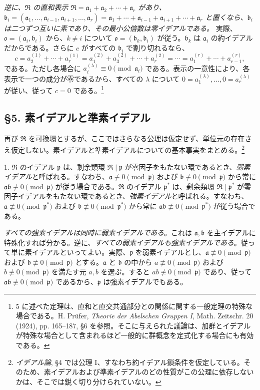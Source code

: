 \documentclass[11pt]{article}
\providecommand{\mR}{\mathfrak{R}}
\providecommand{\ma}{\mathfrak{a}}
\providecommand{\mb}{\mathfrak{b}}
\providecommand{\mo}{\mathfrak{o}}
\providecommand{\mpideal}{\mathfrak{p}}
\begin{document}
\emph{逆に、$\mR$ の直和表示 $\mR=\ma_1+\ma_2+\cdots+\ma_r$ があり、$\mb_i=(\ma_1,\ldots,\ma_{i-1},\ma_{i+1},\ldots,\ma_r)=\ma_1+\cdots+\ma_{i-1}+\ma_{i+1}+\cdots+\ma_r$ と置くなら、$\mb_i$ は二つずつ互いに素であり、その最小公倍数は零イデアルである。} 実際、$\mo=(\ma_i,\mb_i)$ から、$k\ne i$ について $\mo=(\mb_k,\mb_i)$ が従う。$\mb_k$ は $\ma_i$ の約イデアルだからである。さらに $c$ がすべての $\mb_i$ で割り切れるなら、
\[
 c=a_2^{(1)}+\cdots+a_r^{(1)}=a_1^{(2)}+a_3^{(2)}+\cdots+a_r^{(2)}=\cdots=a_1^{(r)}+\cdots+a_{r-1}^{(r)},
\]
である。ただし各場合に $a_i^{(\lambda)}\equiv0\pmod{\ma_i}$ である。表示の一意性により、各表示で一つの成分が零であるから、すべての $\lambda$ について $0=a_1^{(\lambda)},\ldots,0=a_r^{(\lambda)}$ が従い、従って $c=0$ である。\footnote{5 に述べた定理は、直和と直交共通部分との関係に関する一般定理の特殊な場合である。H. Prüfer, \emph{Theorie der Abelschen Gruppen I}, Math. Zeitschr. 20 (1924), pp. 165--187, §6 を参照。そこに与えられた議論は、加群とイデアルが特殊な場合として含まれるほど一般的に群概念を定式化する場合にも有効である。}

\subsection*{§5. 素イデアルと準素イデアル}

再び $\mR$ を可換環とするが、ここではさらなる公理は仮定せず、単位元の存在さえ仮定しない。素イデアルと準素イデアルについての基本事実をまとめる。\footnote{\emph{イデアル論}, §4 では公理 I、すなわち約イデアル鎖条件を仮定している。そのため、素イデアルおよび準素イデアルのどの性質がこの公理に依存しないかは、そこでは鋭く切り分けられていない。}

1. $\mR$ のイデアル $\mpideal$ は、剰余類環 $\mR\mid\mpideal$ が零因子をもたない環であるとき、\emph{弱素イデアル}と呼ばれる。すなわち、$\ma\not\equiv0\pmod{\mpideal}$ および $\mb\not\equiv0\pmod{\mpideal}$ から常に $\ma\mb\not\equiv0\pmod{\mpideal}$ が従う場合である。$\mR$ のイデアル $\mpideal^*$ は、剰余類環 $\mR\mid\mpideal^*$ が零因子イデアルをもたない環であるとき、\emph{強素イデアル}と呼ばれる。すなわち、$\ma\not\equiv0\pmod{\mpideal^*}$ および $\mb\not\equiv0\pmod{\mpideal^*}$ から常に $\ma\mb\not\equiv0\pmod{\mpideal^*}$ が従う場合である。

\emph{すべての強素イデアルは同時に弱素イデアルである}。これは $\ma,\mb$ を主イデアルに特殊化すれば分かる。逆に、\emph{すべての弱素イデアルも強素イデアルである}。従って単に素イデアルといってよい。実際、$\mpideal$ を弱素イデアルとし、$\ma\not\equiv0\pmod{\mpideal}$ および $\mb\not\equiv0\pmod{\mpideal}$ とする。$\ma$ と $\mb$ の中から $a\not\equiv0\pmod{\mpideal}$ および $b\not\equiv0\pmod{\mpideal}$ を満たす元 $a,b$ を選ぶ。すると $ab\not\equiv0\pmod{\mpideal}$ であり、従って $\ma\mb\not\equiv0\pmod{\mpideal}$ であるから、$\mpideal$ は強素イデアルでもある。
\end{document}
